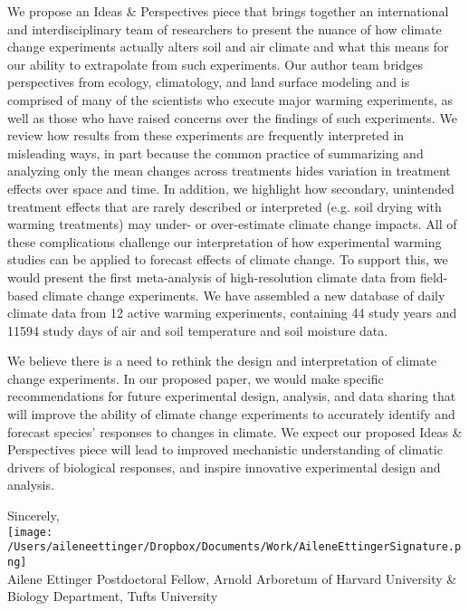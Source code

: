 \documentclass[11pt,a4paper]{letter}
\begin{document}
\begin{letter}{}
We propose an Ideas \& Perspectives piece that  brings together an international and interdisciplinary team of researchers to present the nuance of how climate change experiments actually alters soil and air climate and what this means for our ability to extrapolate from such experiments. Our author team bridges perspectives from ecology, climatology, and land surface modeling and is comprised of many of the scientists who execute major warming experiments, as well as those who have raised concerns over the findings of such experiments. We review how results from these experiments are frequently interpreted in misleading ways, in part because the common practice of summarizing and analyzing only the mean changes across treatments hides variation in treatment effects over space and time. In addition, we highlight how secondary, unintended treatment effects that are rarely described or interpreted (e.g. soil drying with warming treatments) may under- or over-estimate climate change impacts. All of these complications challenge our interpretation of how experimental warming studies can be applied to forecast effects of climate change. To support this, we would present the first meta-analysis of high-resolution climate data from field-based climate change experiments. We have assembled a new database of daily climate data from 12 active warming experiments, containing 44 study years and 11594 study days of air and soil temperature and soil moisture data. 

We believe there is a need to rethink the design and interpretation of climate change experiments. In our proposed paper, we would make specific recommendations for future experimental design, analysis, and data sharing that will improve the ability of climate change experiments to accurately identify and forecast species' responses to changes in climate. We expect our proposed Ideas \& Perspectives piece will lead to improved mechanistic understanding of climatic drivers of biological responses, and inspire innovative experimental design and analysis. 

Sincerely,\\

\texttt{[image: /Users/aileneettinger/Dropbox/Documents/Work/AileneEttingerSignature.png]} \\
Ailene Ettinger
Postdoctoral Fellow, Arnold Arboretum of Harvard University \& Biology Department, Tufts University


\end{letter}
\end{document}
